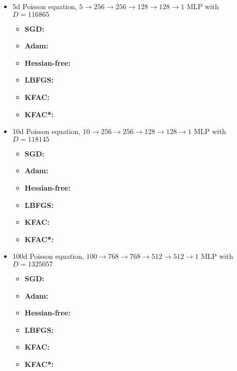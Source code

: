 \begin{itemize}

\item 5d Poisson equation, $5 \to 256 \to 256 \to 128 \to 128 \to 1$ MLP with $D=\num{116865}$
  \begin{itemize}
    \def\pathToRuns{kfac_pinns_exp/exp26_poisson5d_mlp_tanh_256_bayes/tex}
  \item \textbf{SGD:} 
  \item \textbf{Adam:} 
  \item \textbf{Hessian-free:} 
  \item \textbf{LBFGS:} 
  \item \textbf{KFAC:} 
  \item \textbf{KFAC*:} 
  \end{itemize}

\item 10d Poisson equation, $10 \to 256 \to 256 \to 128 \to 128 \to 1$ MLP with $D=\num{118145}$
  \begin{itemize}
    \def\pathToRuns{kfac_pinns_exp/exp32_poisson10d_mlp_tanh_256_bayes/tex}
  \item \textbf{SGD:} 
  \item \textbf{Adam:} 
  \item \textbf{Hessian-free:} 
  \item \textbf{LBFGS:} 
  \item \textbf{KFAC:} 
  \item \textbf{KFAC*:} 
  \end{itemize}

\item 100d Poisson equation, $100 \to 768 \to 768 \to 512 \to 512 \to 1$ MLP with $D=\num{1325057}$
  \begin{itemize}
    \def\pathToRuns{kfac_pinns_exp/exp14_poisson_100d_weinan/tex}
  \item \textbf{SGD:} 
  \item \textbf{Adam:} 
  \item \textbf{Hessian-free:} 
  \item \textbf{LBFGS:} 
  \item \textbf{KFAC:} 
  \item \textbf{KFAC*:} 
  \end{itemize}
\end{itemize}

